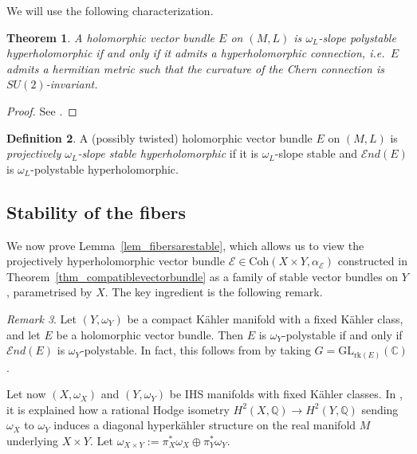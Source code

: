 \documentclass[12pt,a4paper]{amsart}
\theoremstyle{plain}
\newtheorem{thm}{Theorem}[section]
\theoremstyle{definition}
\newtheorem{df}[thm]{Definition}
\theoremstyle{remark}
\newtheorem{rmk}[thm]{Remark}
\def\Coh{\mathrm{Coh}}
\def\H{H}
\def\GL{\mathrm{GL}}
\newcommand{\kE}{\mathcal{E}}
\newcommand{\rk}{\mathrm{rk}}
\newcommand{\cEnd}{\mathcal{E}nd}
\begin{document}
We will use the following characterization.

\begin{thm}\label{thm_hyperholocharacterization}
    A holomorphic vector bundle $E$ on $(M,L)$ is $\omega_L$-slope polystable hyperholomorphic if and only if it admits a hyperholomorphic connection, i.e.~$E$ admits a hermitian metric such that the curvature of the Chern connection is $SU(2)$-invariant.
\end{thm}
\begin{proof}
    See \cite[Theorem 3.19]{verbitsky-hyperholomorphic-sheaves}.
\end{proof}


\begin{df}\label{def_proj_hyperhol}
    A (possibly twisted) holomorphic vector bundle $E$ on $(M,L)$ is \textit{projectively $\omega_{L}$-slope stable hyperholomorphic} if it is $\omega_L$-slope stable and $\cEnd(E)$ is $\omega_L$-polystable hyperholomorphic.
\end{df}



\subsection{Stability of the fibers}
We now prove Lemma~\ref{lem_fibersarestable}, which allows us to view the projectively hyperholomorphic vector bundle $\kE \in \Coh(X\times Y,\alpha_\kE)$ constructed in Theorem~\ref{thm_compatiblevectorbundle} as a family of stable vector bundles on $Y$, parametrised by $X$. The key ingredient is the following remark.

\begin{rmk}\label{rmk_polyiffendpoly}
Let $(Y,\omega_Y)$ be a compact K\"ahler manifold with a fixed K\"ahler class, and let $E$ be a holomorphic vector bundle. Then $E$ is $\omega_Y$-polystable if and only if $\cEnd(E)$ is $\omega_Y$-polystable. In fact, this follows from \cite[Corollary~3.8]{anchouche-biswas-einstein-hermitian} by taking $G = \GL_{\rk(E)}(\mathbb{C})$.
\end{rmk}

Let now $(X,\omega_X)$ and $(Y,\omega_Y)$ be IHS manifolds with fixed K\"ahler classes. In \cite[Section~5.3]{markman}, it is explained how a rational Hodge isometry $\H^2(X,\mathbb{Q}) \rightarrow \H^2(Y,\mathbb{Q})$ sending $\omega_X$ to $\omega_Y$ induces a diagonal hyperk\"ahler structure on the real manifold $M$ underlying $X \times Y$. Let $\omega_{X\times Y} := \pi_X^*\omega_X \oplus \pi_Y^*\omega_Y$.
\end{document}
